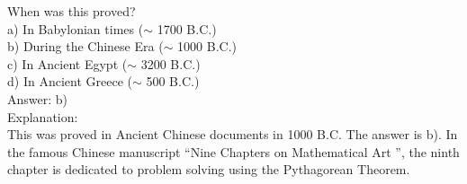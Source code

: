 \documentclass[letterpaper, 12pt]{article}
\begin{document}
When was this proved?\\

a) In Babylonian times ($\sim$ 1700 B.C.)\\
b) During the Chinese Era ($\sim$ 1000 B.C.)\\
c) In Ancient Egypt ($\sim$ 3200 B.C.)\\
d) In Ancient Greece ($\sim$ 500 B.C.)\\

Answer: b)\\

Explanation:\\
This was proved in Ancient Chinese documents in 1000 B.C. The answer is b). In the famous Chinese manuscript ``{Nine Chapters on Mathematical Art} '', the ninth chapter is dedicated to problem solving using the Pythagorean Theorem.\\
\end{document}

